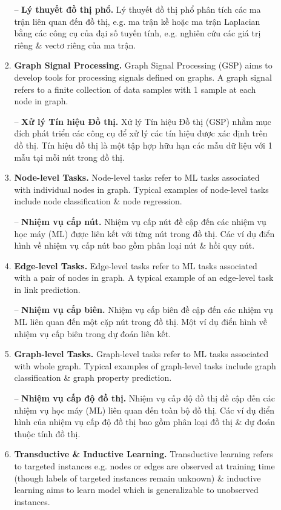 \documentclass{article}
\begin{document}
\begin{itemize}
\begin{itemize}
\begin{enumerate}
            -- {\bf Lý thuyết đồ thị phổ.} Lý thuyết đồ thị phổ phân tích các ma trận liên quan đến đồ thị, e.g. ma trận kề hoặc ma trận Laplacian bằng các công cụ của đại số tuyến tính, e.g. nghiên cứu các giá trị riêng \& vectơ riêng của ma trận.
            \item {\bf Graph Signal Processing.} Graph Signal Processing (GSP) aims to develop tools for processing signals defined on graphs. A graph signal refers to a finite collection of data samples with 1 sample at each node in graph.

            -- {\bf Xử lý Tín hiệu Đồ thị.} Xử lý Tín hiệu Đồ thị (GSP) nhằm mục đích phát triển các công cụ để xử lý các tín hiệu được xác định trên đồ thị. Tín hiệu đồ thị là một tập hợp hữu hạn các mẫu dữ liệu với 1 mẫu tại mỗi nút trong đồ thị.
            \item {\bf Node-level Tasks.} Node-level tasks refer to ML tasks associated with individual nodes in graph. Typical examples of node-level tasks include node classification \& node regression.

            -- {\bf Nhiệm vụ cấp nút.} Nhiệm vụ cấp nút đề cập đến các nhiệm vụ học máy (ML) được liên kết với từng nút trong đồ thị. Các ví dụ điển hình về nhiệm vụ cấp nút bao gồm phân loại nút \& hồi quy nút.
            \item {\bf Edge-level Tasks.} Edge-level tasks refer to ML tasks associated with a pair of nodes in graph. A typical example of an edge-level task in link prediction.

            -- {\bf Nhiệm vụ cấp biên.} Nhiệm vụ cấp biên đề cập đến các nhiệm vụ ML liên quan đến một cặp nút trong đồ thị. Một ví dụ điển hình về nhiệm vụ cấp biên trong dự đoán liên kết.
            \item {\bf Graph-level Tasks.} Graph-level tasks refer to ML tasks associated with whole graph. Typical examples of graph-level tasks include graph classification \& graph property prediction.

            -- {\bf Nhiệm vụ cấp độ đồ thị.} Nhiệm vụ cấp độ đồ thị đề cập đến các nhiệm vụ học máy (ML) liên quan đến toàn bộ đồ thị. Các ví dụ điển hình của nhiệm vụ cấp độ đồ thị bao gồm phân loại đồ thị \& dự đoán thuộc tính đồ thị.
            \item {\bf Transductive \& Inductive Learning.} Transductive learning refers to targeted instances e.g. nodes or edges are observed at training time (though labels of targeted instances remain unknown) \& inductive learning aims to learn model which is generalizable to unobserved instances.


\end{enumerate}
\end{itemize}
\end{itemize}
\end{document}
